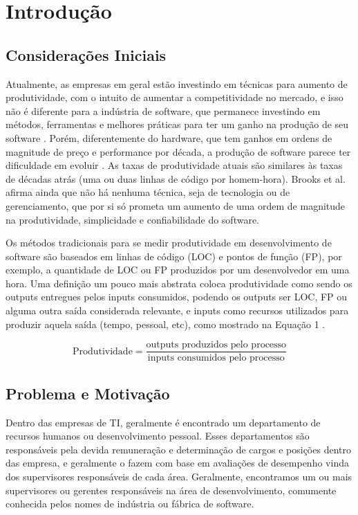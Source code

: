 \chapter[Introdução]{Introdução}

\section{Considerações Iniciais}\label{secao1.1}
Atualmente, as empresas em geral estão investindo em técnicas para aumento de produtividade, com o intuito de aumentar a competitividade no mercado, e isso não é diferente para a indústria de software, que permanece investindo em métodos, ferramentas e melhores práticas para ter um ganho na produção de seu software \cite{deBarrosSampaio2010}.
Porém, diferentemente do hardware, que tem ganhos em ordens de magnitude de preço e performance por década, a produção de software parece ter dificuldade em evoluir \cite{Boehm1987}. As taxas de produtividade atuais são similares às taxas de décadas atrás (uma ou duas linhas de código por homem-hora)\cite{Boehm1987}. Brooks et al. \cite{BrooksJr1987} afirma ainda que não há nenhuma técnica, seja de tecnologia ou de gerenciamento, que por si só prometa um aumento de uma ordem de magnitude na produtividade, simplicidade e confiabilidade do software.

Os métodos tradicionais para se medir produtividade em desenvolvimento de software são baseados em linhas de código (LOC) e pontos de função (FP)\cite{Wagner2008}, por exemplo, a quantidade de LOC ou FP produzidos por um desenvolvedor em uma hora. Uma definição um pouco mais abstrata coloca produtividade como sendo os outputs entregues pelos inputs consumidos, podendo os outputs ser LOC, FP ou alguma outra saída considerada relevante, e inputs como recursos utilizados para produzir aquela saída (tempo, pessoal, etc), como mostrado na Equação 1 \cite{Boehm1987, Walston1977, Yu1991}.

\begin{equation}
\text{Produtividade} = \dfrac{\text{outputs produzidos pelo processo}}{\text{inputs consumidos pelo processo}}
\end{equation} 

\section{Problema e Motivação}\label{secao1.2}
Dentro das empresas de TI, geralmente é encontrado um departamento de recursos humanos ou desenvolvimento pessoal. Esses departamentos são responsáveis pela devida remuneração e determinação de cargos e posições dentro das empresa, e geralmente o fazem com base em avaliações de desempenho vinda dos supervisores responsáveis de cada área. Geralmente, encontramos um ou mais supervisores ou gerentes responsáveis na área de desenvolvimento, comumente conhecida pelos nomes de indústria ou fábrica de software.

